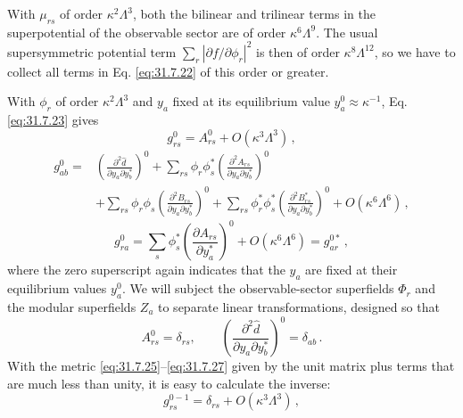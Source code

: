 With \(\mu_{rs}\) of order \(\kappa^2\Lambda^3\), both the bilinear and
trilinear terms in the superpotential of the observable sector are of order
\(\kappa^6\Lambda^9\). The usual supersymmetric potential term
\(\sum_r|\partial f/\partial\phi_r|^2\) is then of order
\(\kappa^8\Lambda^{12}\), so we have to collect all terms in
Eq. \eqref{eq:31.7.22} of this order or greater.

With \(\phi_r\) of order \(\kappa^2\Lambda^3\) and \(y_a\) fixed at its
equilibrium value \(y_a^0\approx\kappa^{-1}\), Eq. \eqref{eq:31.7.23}
gives
\begin{equation}
  g_{rs}^0=A_{rs}^0+O(\kappa^3\Lambda^3)\,,
  \tag{31.7.25}\label{eq:31.7.25}
\end{equation}
\begin{equation}
  \begin{aligned}
  g_{ab}^0={}&
  \left(\frac{\partial^2\widehat d}
    {\partial y_a\partial y_b^*}\right)^0
  +\sum_{rs}\phi_r\phi_s^*
    \left(\frac{\partial^2A_{rs}}
      {\partial y_a\partial y_b^*}\right)^0
  \\
  &+\sum_{rs}\phi_r\phi_s
    \left(\frac{\partial^2B_{rs}}
      {\partial y_a\partial y_b^*}\right)^0
  +\sum_{rs}\phi_r^*\phi_s^*
    \left(\frac{\partial^2B_{rs}^*}
      {\partial y_a\partial y_b^*}\right)^0
  +O(\kappa^6\Lambda^6)\,,
  \end{aligned}
  \tag{31.7.26}\label{eq:31.7.26}
\end{equation}
\begin{equation}
  g_{ra}^0
  =\sum_s\phi_s^*
    \left(\frac{\partial A_{rs}}{\partial y_a^*}\right)^0
   +O(\kappa^6\Lambda^6)
  =g_{ar}^{0*}\,,
  \tag{31.7.27}\label{eq:31.7.27}
\end{equation}
where the zero superscript again indicates that the \(y_a\) are fixed at
their equilibrium values \(y_a^0\). We will subject the observable-sector
superfields \(\Phi_r\) and the modular superfields \(Z_a\) to separate
linear transformations, designed so that
\begin{equation}
  A_{rs}^0=\delta_{rs},\qquad
  \left(\frac{\partial^2\widehat d}
    {\partial y_a\partial y_b^*}\right)^0
  =\delta_{ab}\,.
  \tag{31.7.28}\label{eq:31.7.28}
\end{equation}
With the metric \eqref{eq:31.7.25}--\eqref{eq:31.7.27} given by the unit
matrix plus terms that are much less than unity, it is easy to calculate
the inverse:
\begin{equation}
  g_{rs}^{0-1}=\delta_{rs}+O(\kappa^3\Lambda^3)\,,
  \tag{31.7.29}\label{eq:31.7.29}
\end{equation}
